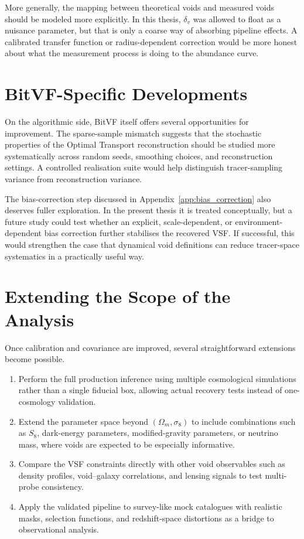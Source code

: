 \documentclass[12pt]{report}
\begin{document}
More generally, the mapping between theoretical voids and measured voids should be modeled more explicitly. In this thesis, $\delta_v$ was allowed to float as a nuisance parameter, but that is only a coarse way of absorbing pipeline effects. A calibrated transfer function or radius-dependent correction would be more honest about what the measurement process is doing to the abundance curve.

\section{BitVF-Specific Developments}

On the algorithmic side, BitVF itself offers several opportunities for improvement. The sparse-sample mismatch suggests that the stochastic properties of the Optimal Transport reconstruction should be studied more systematically across random seeds, smoothing choices, and reconstruction settings. A controlled realisation suite would help distinguish tracer-sampling variance from reconstruction variance.

The bias-correction step discussed in Appendix~\ref{app:bias_correction} also deserves fuller exploration. In the present thesis it is treated conceptually, but a future study could test whether an explicit, scale-dependent, or environment-dependent bias correction further stabilises the recovered VSF. If successful, this would strengthen the case that dynamical void definitions can reduce tracer-space systematics in a practically useful way.

\section{Extending the Scope of the Analysis}

Once calibration and covariance are improved, several straightforward extensions become possible.

\begin{enumerate}
    \item Perform the full production inference using multiple cosmological simulations rather than a single fiducial box, allowing actual recovery tests instead of one-cosmology validation.
    \item Extend the parameter space beyond $(\Omega_m,\sigma_8)$ to include combinations such as $S_8$, dark-energy parameters, modified-gravity parameters, or neutrino mass, where voids are expected to be especially informative.
    \item Compare the VSF constraints directly with other void observables such as density profiles, void--galaxy correlations, and lensing signals to test multi-probe consistency.
    \item Apply the validated pipeline to survey-like mock catalogues with realistic masks, selection functions, and redshift-space distortions as a bridge to observational analysis.
\end{enumerate}
\end{document}

